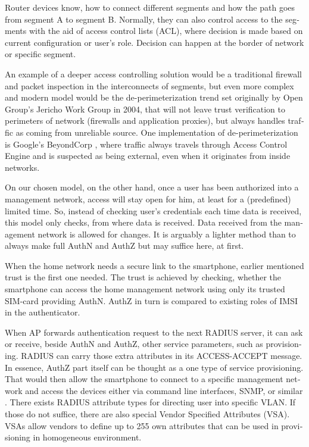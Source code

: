 \documentclass[12pt,a4paper,english]{tutthesis}
\begin{document}
\begin{otherlanguage}{english}
Router devices know, how to connect different segments and how the
path goes from segment A to segment B. Normally, they can also control
access to the segments with the aid of access control lists (ACL), where
decision is made based on current configuration or user's role.
Decision can happen at the border of network or specific segment.




An example of a deeper access controlling  solution would be a traditional firewall and packet
inspection in the interconnects of segments, but even more complex and modern model
would be the de-perimeterization trend set originally by Open Group's
Jericho Work Group \cite{jericho2004} in 2004, that will not leave trust verification to
perimeters of network (firewalls and application proxies), but 
always handles traffic as coming from unreliable source.
One implementation of de-perimeterization is 
Google's BeyondCorp \cite{2014-beyondcorp}, 
where traffic always travels through Access Control Engine
and is suspected as being external, even when it originates from
inside networks. 



On our chosen model, on the other hand, once a user has been authorized into a management network, access
will stay open for him, at least for a (predefined) limited time.
So, instead of checking user's credentials each time data is received,
this model only checks, from where data is received. 
Data received from the management network is allowed for changes.
It is arguably a lighter method than to always make 
full AuthN and AuthZ but may suffice here, at first.


When the home network needs a secure link to the smartphone, earlier
mentioned trust is the first one needed.  The trust is achieved by
checking, whether the smartphone can access the home management
network using only its trusted SIM-card providing AuthN. AuthZ in
turn is compared to existing roles of IMSI in the authenticator.




When AP forwards authentication request to the next RADIUS server, it
can ask or receive, beside AuthN and AuthZ, other service parameters,
such as provisioning. RADIUS can carry those extra attributes in its
ACCESS-ACCEPT message.  In essence, AuthZ part itself can be thought
as a one type of service provisioning.  That would then allow the
smartphone to connect to a specific management network and access the
devices either via command line interfaces, SNMP, or
similar \cite[p.4]{rfc5608}.
There exists RADIUS attribute types for directing user into specific
VLAN. If those do not suffice, there are also special Vendor Specified
Attributes (VSA). VSAs allow vendors to define up to 255 own
attributes that can be used in provisioning in homogeneous environment. 



\end{otherlanguage}
\end{document}
